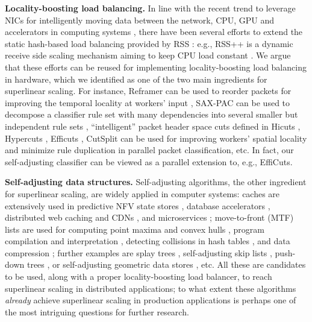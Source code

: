 \noindent%
\textbf{Locality-boosting load balancing.} %
In line with the recent trend to leverage NICs for intelligently moving data between the network, CPU, GPU and accelerators in computing systems \cite{sherry-ccr23}, there have been several efforts to extend the static hash-based load balancing provided by RSS \cite{rss-linux}: e.g., RSS++ is a dynamic receive side scaling mechanism aiming to keep CPU load constant \cite{10.1145/3359989.3365412}. We argue that these efforts can be reused for implementing locality-boosting load balancing in hardware, which we identified as one of the two main ingredients for superlinear scaling. For instance, Reframer can be used to reorder packets for improving the temporal locality at workers' input \cite{276946,246322}, SAX-PAC can be used to decompose a classifier rule set with many dependencies into several smaller but independent rule sets \cite{10.1145/2619239.2626294}, ``intelligent'' packet header space cuts \cite{180587} defined in Hicuts \cite{820051}, Hypercuts \cite{10.1145/863955.863980}, Efficuts \cite{10.1145/1851182.1851208}, CutSplit \cite{8485947} can be used for improving workers' spatial locality and minimize rule duplication in parallel packet classification, etc. In fact, our self-adjusting classifier can be viewed as a parallel extension to, e.g., EffiCuts.

\noindent%
\textbf{Self-adjusting data structures.} %
Self-adjusting algorithms, the other ingredient for superlinear scaling, are widely applied in computer systems: caches are extensively used in predictive NFV state stores \cite{295537}, database accelerators \cite{10.5555/1012889.1012894, 180324, ghigoff2021bmc}, distributed web caching and CDNs \cite{295603}, and microservices \cite{295493}; move-to-front (MTF) lists are used for computing point maxima and convex hulls \cite{BentleyCL93}, program compilation and interpretation \cite{HesterH85}, detecting collisions in hash tables \cite{HesterH85}, and data compression \cite{BentleySTW86}; further examples are splay trees \cite{SleatorT85Splay}, self-adjusting skip lists \cite{BoseDL08}, push-down trees \cite{Avin0020}, or self-adjusting geometric data stores \cite{ParkM12}, etc. All these are candidates to be used, along with a proper locality-boosting load balancer, to reach superlinear scaling in distributed applications; to what extent these algorithms \emph{already} achieve superlinear scaling in production applications is perhaps one of the most intriguing questions for further research.
  

